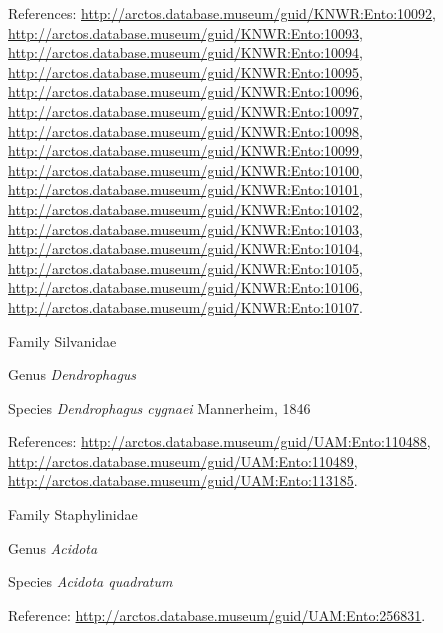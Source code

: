 \documentclass[9pt, article]{memoir}
\begin{document}
\begin{multicols}{2}
\vspace{6pt}References: 
\url{http://arctos.database.museum/guid/KNWR:Ento:10092}, 
\url{http://arctos.database.museum/guid/KNWR:Ento:10093}, 
\url{http://arctos.database.museum/guid/KNWR:Ento:10094}, 
\url{http://arctos.database.museum/guid/KNWR:Ento:10095}, 
\url{http://arctos.database.museum/guid/KNWR:Ento:10096}, 
\url{http://arctos.database.museum/guid/KNWR:Ento:10097}, 
\url{http://arctos.database.museum/guid/KNWR:Ento:10098}, 
\url{http://arctos.database.museum/guid/KNWR:Ento:10099}, 
\url{http://arctos.database.museum/guid/KNWR:Ento:10100}, 
\url{http://arctos.database.museum/guid/KNWR:Ento:10101}, 
\url{http://arctos.database.museum/guid/KNWR:Ento:10102}, 
\url{http://arctos.database.museum/guid/KNWR:Ento:10103}, 
\url{http://arctos.database.museum/guid/KNWR:Ento:10104}, 
\url{http://arctos.database.museum/guid/KNWR:Ento:10105}, 
\url{http://arctos.database.museum/guid/KNWR:Ento:10106}, 
\url{http://arctos.database.museum/guid/KNWR:Ento:10107}.

\vspace{6pt}\noindent\hspace{24pt}Family Silvanidae


\vspace{6pt}\noindent\hspace{30pt}Genus \textit{Dendrophagus}


\vspace{6pt}\noindent\hspace{36pt}Species \textit{Dendrophagus cygnaei} Mannerheim, 1846


\vspace{6pt}References: 
\url{http://arctos.database.museum/guid/UAM:Ento:110488}, 
\url{http://arctos.database.museum/guid/UAM:Ento:110489}, 
\url{http://arctos.database.museum/guid/UAM:Ento:113185}.

\vspace{6pt}\noindent\hspace{24pt}Family Staphylinidae


\vspace{6pt}\noindent\hspace{30pt}Genus \textit{Acidota}


\vspace{6pt}\noindent\hspace{36pt}Species \textit{Acidota quadratum}


\vspace{6pt}Reference: 
\url{http://arctos.database.museum/guid/UAM:Ento:256831}.


\end{multicols}
\end{document}
